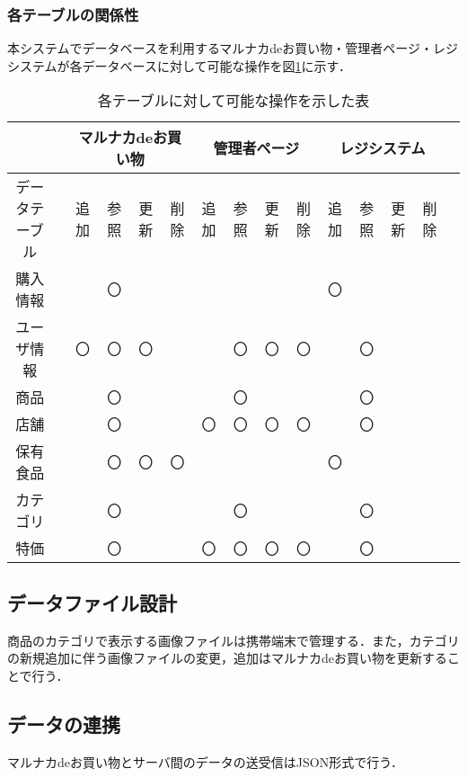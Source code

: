 \documentclass[a4j]{jarticle}
\begin{document}
\subsubsection{各テーブルの関係性}
本システムでデータベースを利用するマルナカdeお買い物・管理者ページ・レジシステムが各データベースに対して可能な操作を図\ref{tab:DB権限}に示す．
\begin{table}[H]
\caption{各テーブルに対して可能な操作を示した表}
\label{tab:DB権限}
\begin{center}
\begin{tabular}{|c|c|c|c|c|c|c|c|c|c|c|c|c|c|c|}%
\hline
&&\multicolumn{4}{|c|}{マルナカdeお買い物}&\multicolumn{4}{|c|}{管理者ページ}&\multicolumn{4}{|c|}{レジシステム}\\ \hline
データテーブル&&追加&参照&更新&削除&追加&参照&更新&削除&追加&参照&更新&削除\\ \hline\hline
購入情報	&&　&〇&	&	& 	&	&	&	&〇&&&\\ \hline
ユーザ情報	&&〇&〇&〇	&	&	&〇&〇&〇& &〇&&\\ \hline
商品		&&　&〇&	&	& 	&〇&	&	& &〇&&\\ \hline
店舗		&&　&〇&	&	&〇&〇&〇&〇& &〇&&\\ \hline
保有食品	&&　&〇&〇&〇& 	&	&	&	& 〇&&&\\ \hline
カテゴリ		&&　&〇&	&	&	&〇&	&	& &〇&&\\ \hline
特価		&&　&〇&	&	&〇&〇&〇&〇& &〇&&\\ \hline

\end{tabular}
\end{center}
\end{table}

\subsection{データファイル設計}
商品のカテゴリで表示する画像ファイルは携帯端末で管理する．また，カテゴリの新規追加に伴う画像ファイルの変更，追加はマルナカdeお買い物を更新することで行う．\\
\subsection{データの連携}
マルナカdeお買い物とサーバ間のデータの送受信はJSON形式で行う．
\end{document}
